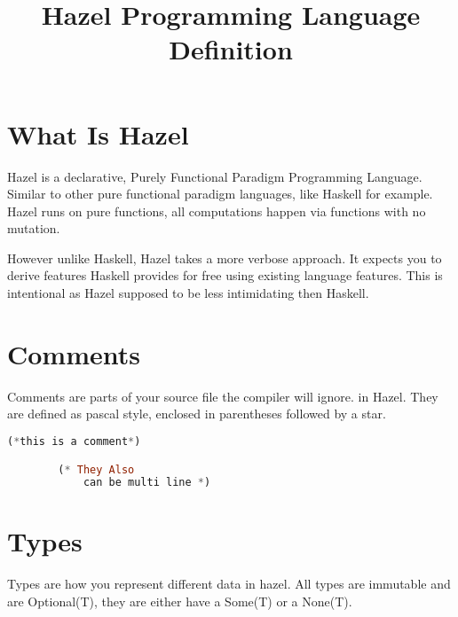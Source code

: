\documentclass{article}
\title{Hazel Programming Language Definition}
\author{}
\date{}
\begin{document}
\maketitle



\section{What Is Hazel}

Hazel is a declarative, Purely Functional Paradigm Programming Language. Similar to other pure functional paradigm languages, like Haskell for example. Hazel runs on pure functions, all computations happen via functions with no mutation. 

However unlike Haskell, Hazel takes a more verbose approach. It expects you to derive features Haskell provides for free using existing language features. This is intentional as Hazel supposed to be less intimidating then Haskell. 





\section{Comments}

Comments are parts of your source file the compiler will ignore. 
in Hazel. They are defined as pascal style, enclosed in parentheses followed by a star. 

\begin{lstlisting}[language=Haskell]
        (*this is a comment*)

        (* They Also 
            can be multi line *)
\end{lstlisting}
\section{Types}

Types are how you represent different data in hazel. All types are immutable and are Optional(T), they are either have a Some(T) or a None(T). 
\end{document}
